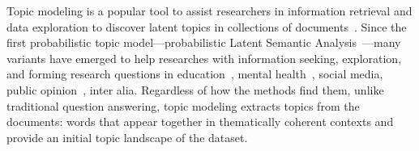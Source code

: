 Topic modeling is a popular tool to assist researchers in information
retrieval and data exploration to discover latent topics in
collections of documents~\cite{ABDELRAZEK2023102131}.
%
%
Since the first probabilistic topic model---probabilistic
Latent Semantic Analysis~\cite[p]{hoffmann-99}---many
variants have emerged to help researches with information seeking,
exploration, and forming research questions in education~\cite{SunYan2023}, mental
health~\cite{gao2023discoveringmentalhealthresearch}, social media,
public opinion~\cite{LaureateBuntineLinger2023}, inter alia.
Regardless of how the methods find them, unlike traditional
question answering, topic modeling extracts topics from the documents:
words that appear together in thematically coherent contexts and
provide an initial topic landscape of the dataset.
%



